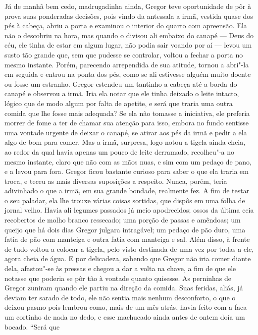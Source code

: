 Já de manhã bem cedo, madrugadinha ainda, Gregor teve oportunidade de pôr
à prova suas ponderadas decisões, pois vindo da antessala a irmã, vestida
quase dos pés à cabeça, abriu a porta e examinou o interior do quarto com
apreensão. Ela não o descobriu na hora, mas quando o divisou ali embaixo
do canapé --- Deus do céu, ele tinha de estar em algum lugar, não podia sair
voando por aí --- levou um susto tão grande que, sem que pudesse se
controlar, voltou a fechar a porta no mesmo instante. Porém, parecendo
arrependida de sua atitude, tornou a abri"-la em seguida e entrou na ponta
dos pés, como se ali estivesse alguém muito doente ou fosse um estranho.
Gregor estendeu um tantinho a cabeça até a borda do canapé e observou a
irmã. Iria ela notar que ele tinha deixado o leite intacto, lógico que de
modo algum por falta de apetite, e será que traria uma outra comida que
lhe fosse mais adequada? Se ela não tomasse a iniciativa, ele preferia
morrer de fome a ter de chamar sua atenção para isso, embora no fundo
sentisse uma vontade urgente de deixar o canapé, se atirar aos pés da irmã
e pedir a ela algo de bom para comer. Mas a irmã, surpresa, logo notou a
tigela ainda cheia, ao redor da qual havia apenas um pouco de leite
derramado, recolheu"-a no mesmo instante, claro que não com as mãos nuas, e
sim com um pedaço de pano, e a levou para fora. Gregor ficou bastante
curioso para saber o que ela traria em troca, e teceu as mais diversas
suposições a respeito. Nunca, porém, teria adivinhado o que a irmã, em sua
grande bondade, realmente fez. A fim de testar o seu paladar, ela lhe
trouxe várias coisas sortidas, que dispôs em uma folha de jornal velho.
Havia ali legumes passados já meio apodrecidos; ossos da última ceia
recobertos de molho branco ressecado; uma porção de passas e amêndoas; um
queijo que há dois dias Gregor julgara intragável; um pedaço de pão duro,
uma fatia de pão com manteiga e outra fatia com manteiga e sal. Além
disso, à frente de tudo voltou a colocar a tigela, pelo visto destinada de
uma vez por todas a ele, agora cheia de água. E por delicadeza, sabendo
que Gregor não iria comer diante dela, afastou"-se às pressas e chegou a
dar a volta na chave, a fim de que ele notasse que poderia se pôr tão à
vontade quanto quisesse. As perninhas de Gregor zuniram quando ele partiu
na direção da comida. Suas feridas, aliás, já deviam ter sarado de todo,
ele não sentia mais nenhum desconforto, o que o deixou pasmo pois lembrou
como, mais de um mês atrás, havia feito com a faca um cortinho de nada no
dedo, e esse machucado ainda antes de ontem doía um bocado. “Será que
